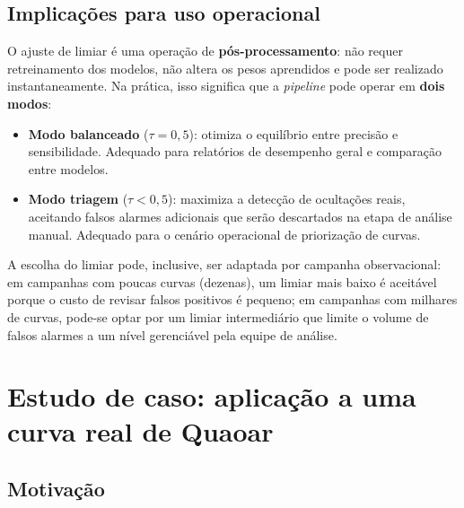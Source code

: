 \documentclass[msc]{on} %
\begin{document}
\subsection{Implicações para uso operacional}

O ajuste de limiar é uma operação de \textbf{pós-processamento}: não requer retreinamento dos modelos, não altera os pesos aprendidos e pode ser realizado instantaneamente. Na prática, isso significa que a \textit{pipeline} pode operar em \textbf{dois modos}:

\begin{itemize}
	\item \textbf{Modo balanceado} ($\tau = 0{,}5$): otimiza o equilíbrio entre precisão e sensibilidade. Adequado para relatórios de desempenho geral e comparação entre modelos.
	\item \textbf{Modo triagem} ($\tau < 0{,}5$): maximiza a detecção de ocultações reais, aceitando falsos alarmes adicionais que serão descartados na etapa de análise manual. Adequado para o cenário operacional de priorização de curvas.
\end{itemize}

A escolha do limiar pode, inclusive, ser adaptada por campanha observacional: em campanhas com poucas curvas (dezenas), um limiar mais baixo é aceitável porque o custo de revisar falsos positivos é pequeno; em campanhas com milhares de curvas, pode-se optar por um limiar intermediário que limite o volume de falsos alarmes a um nível gerenciável pela equipe de análise.

\section{Estudo de caso: aplicação a uma curva real de Quaoar}
\label{sec:estudo_caso_quaoar}

\subsection{Motivação}
\end{document}
